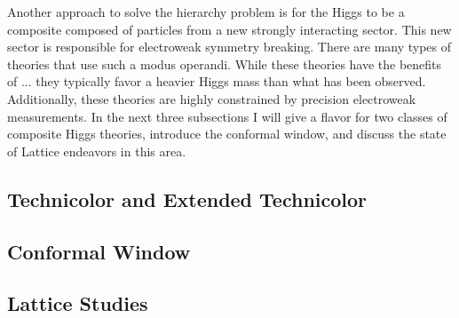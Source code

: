
Another approach to solve the hierarchy problem is for the Higgs to be a composite composed of particles from a new strongly interacting sector.
This new sector is responsible for electroweak symmetry breaking.
There are many types of theories that use such a modus operandi.
While these theories have the benefits of ... they typically favor a heavier Higgs mass than what has been observed.
Additionally, these theories are highly constrained by precision electroweak measurements.
In the next three subsections I will give a flavor for two classes of composite Higgs theories, introduce the conformal window, and discuss the state of Lattice endeavors in this area.

\subsection{Technicolor and Extended Technicolor}


\subsection{Conformal Window}

\subsection{Lattice Studies}
